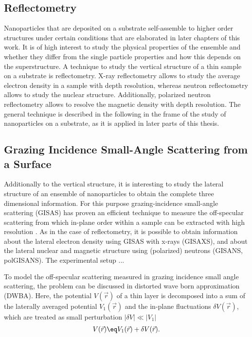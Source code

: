 \documentclass[\main/dresen_thesis.tex]{subfiles}
\begin{document}
\subsection{Reflectometry}\label{sec:theoreticalBackground:scattering:reflectometry}
Nanoparticles that are deposited on a substrate self-assemble to higher order structures under certain conditions that are elaborated in later chapters of this work.
It is of high interest to study the physical properties of the ensemble and whether they differ from the single particle properties and how this depends on the superstructure.
A technique to study the vertical structure of a thin sample on a substrate is reflectometry.
X-ray reflectometry allows to study the average electron density in a sample with depth resolution, whereas neutron reflectometry allows to study the nuclear structure.
Additionally, polarized neutron reflectometry allows to resolve the magnetic density with depth resolution.
The general technique is described in the following in the frame of the study of nanoparticles on a substrate, as it is applied in later parts of this thesis.

\subsection{Grazing Incidence Small-Angle Scattering from a Surface}\label{sec:theoreticalBackground:scattering:GISAS}
Additionally to the vertical structure, it is interesting to study the lateral structure of an ensemble of nanoparticles to obtain the complete three dimensional information.
For this purpose grazing-incidence small-angle scattering (GISAS) has proven an efficient technique to measure the off-specular scattering from which in-plane order within a sample can be extracted with high resolution \cite{Renaud_2009_Probi}.
As in the case of reflectometry, it is possible to obtain information about the lateral electron density using GISAS with x-rays (GISAXS), and about the lateral nuclear and magnetic structure using (polarized) neutrons (GISANS, polGISANS).
The experimental setup ...

To model the off-specular scattering measured in grazing incidence small angle scattering, the problem can be discussed in distorted wave born approximation (DWBA). Here, the potential $V(\vec{r})$ of a thin layer is decomposed into a sum of the laterally averaged potential $V_1(\vec{r})$ and the in-plane fluctuations $\delta V(\vec{r})$, which are treated as small perturbation $|\delta V| \ll |V_1|$
\begin{align}
  V(\vec{r}) \eq V_1(\vec{r}) + \delta V(\vec{r}).
\end{align}
\end{document}
